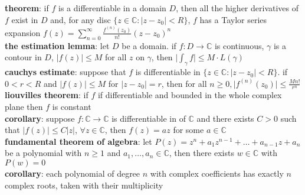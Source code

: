 \documentclass[a4paper]{article}
\newcommand*\abs[1]{\vert #1 \vert}
\begin{document}
\begin{framed}
	\noindent
	\textbf{theorem}: if $f$ is a differentiable in a domain $D$, then all the higher derivatives of $f$ exist in $D$ and, for any disc $\{ z \in \mathbb{C} : \abs{z - z_0} < R \}$, $f$ has a Taylor series expansion $f(z) = \sum_{n=0}^\infty \frac{f^{(n)}(z_0)}{n!}(z - z_0)^n$\\
	
	\noindent
	\textbf{the estimation lemma}: let $D$ be a domain. if $f: D \rightarrow \mathbb{C}$ is continuous, $\gamma$ is a contour in $D$, $\abs{f(z)} \leq M$ for all $z$ on $\gamma$, then $\abs{\int_\gamma f} \leq M \cdot L(\gamma)$\\
	
	\noindent
	\textbf{cauchys estimate}: suppose that $f$ is differentiable in $\{ z \in \mathbb{C} : \abs{z - z_0} < R \}$. if $0 < r < R$ and $\abs{f(z)} \leq M$ for $\abs{z - z_0} = r$, then for all $n \geq 0, \abs{f^{(n)}(z_0)} \leq \frac{Mn!}{r^n}$\\
	
	\noindent
	\textbf{liouvilles theorem}: if $f$ if differentiable and bounded in the whole complex plane then $f$ is constant\\
	
	\noindent
	\textbf{corollary}: suppose $f: \mathbb{C} \rightarrow \mathbb{C}$ is differentiable in of $\mathbb{C}$ and there exists $C > 0$ such that $\abs{f(z)} \leq C \abs{z}$, $\forall z \in \mathbb{C}$, then $f(z) = az$ for some $a \in \mathbb{C}$\\
	
	\noindent
	\textbf{fundamental theorem of algebra}: let $P(z) = z^n + a_1z^{n-1} + \dots + a_{n-1}z + a_n$ be a polynomial with $n \geq 1$ and $a_1, \dots, a_n \in \mathbb{C}$, then there exists $w \in \mathbb{C}$ with $P(w) = 0$\\
	
	\noindent
	\textbf{corollary}: each polynomial of degree $n$ with complex coefficients has exactly $n$ complex roots, taken with their multiplicity
\end{framed}
\end{document}
